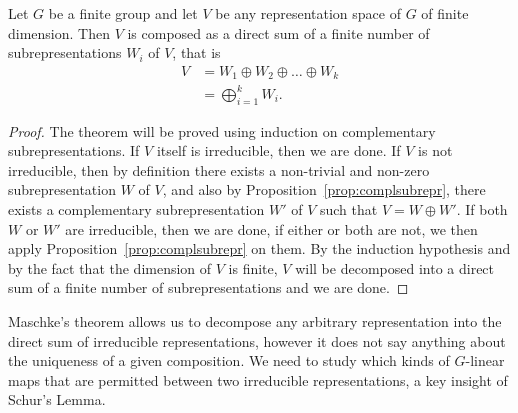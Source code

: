 \begin{theorem}\label{thm:maschkes}
	Let $G$ be a finite group and let $V$ be any representation space of $G$ of finite dimension. Then $V$ is composed as a direct sum of a finite number of subrepresentations $W_i$ of $V$, that is
	\begin{align*}
		V &= W_1 \oplus W_2 \oplus \dots \oplus W_k \\
		&= \bigoplus_{i=1}^k W_i.
	\end{align*}
\end{theorem}
\begin{proof}
	The theorem will be proved using induction on complementary subrepresentations. If $V$ itself is irreducible, then we are done. If $V$ is not irreducible, then by definition there exists a non-trivial and non-zero subrepresentation $W$ of $V$, and also by Proposition~\ref{prop:complsubrepr}, there exists a complementary subrepresentation $W'$ of $V$ such that $V = W \oplus W'$. If both $W$ or $W'$ are irreducible, then we are done, if either or both are not, we then apply Proposition~\ref{prop:complsubrepr} on them. By the induction hypothesis and by the fact that the dimension of $V$ is finite, $V$ will be decomposed into a direct sum of a finite number of subrepresentations and we are done.
\end{proof}


Maschke's theorem allows us to decompose any arbitrary representation into the direct sum of irreducible representations, however it does not say anything about the uniqueness of a given composition. We need to study which kinds of $G$-linear maps that are permitted between two irreducible representations, a key insight of Schur's Lemma.


